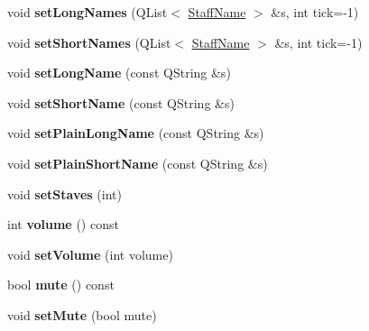 \begin{DoxyCompactItemize}
\item 
\mbox{\label{class_ms_1_1_part_a2ddd2f29d950013f9a850105090d5509}} 
void {\bfseries set\+Long\+Names} (Q\+List$<$ \hyperlink{class_ms_1_1_staff_name}{Staff\+Name} $>$ \&s, int tick=-\/1)
\item 
\mbox{\label{class_ms_1_1_part_a8f1a54bd0b872fefa32e171bd2712060}} 
void {\bfseries set\+Short\+Names} (Q\+List$<$ \hyperlink{class_ms_1_1_staff_name}{Staff\+Name} $>$ \&s, int tick=-\/1)
\item 
\mbox{\label{class_ms_1_1_part_aef3df85794ccf339b54e4e6c683fc40f}} 
void {\bfseries set\+Long\+Name} (const Q\+String \&s)
\item 
\mbox{\label{class_ms_1_1_part_acc3377d2b92a5cb0cb41c4ce61d7063c}} 
void {\bfseries set\+Short\+Name} (const Q\+String \&s)
\item 
\mbox{\label{class_ms_1_1_part_a0da062a1f17c8e4980fb3666608b94c5}} 
void {\bfseries set\+Plain\+Long\+Name} (const Q\+String \&s)
\item 
\mbox{\label{class_ms_1_1_part_a5b52e69bc036527d9fb9fccd6341d80b}} 
void {\bfseries set\+Plain\+Short\+Name} (const Q\+String \&s)
\item 
\mbox{\label{class_ms_1_1_part_a244092dfe0743085b642804e6cc93a21}} 
void {\bfseries set\+Staves} (int)
\item 
\mbox{\label{class_ms_1_1_part_a0e585dd66a3a2346ae3da087f214ce15}} 
int {\bfseries volume} () const
\item 
\mbox{\label{class_ms_1_1_part_a024dbbd42e4feca939eb3bc2f8da57c6}} 
void {\bfseries set\+Volume} (int volume)
\item 
\mbox{\label{class_ms_1_1_part_a0213a26d57ddd89d1e7e7bafc3881dbc}} 
bool {\bfseries mute} () const
\item 
\mbox{\label{class_ms_1_1_part_a6b3c7185f490f8e5ff4f1d49ca9eae76}} 
void {\bfseries set\+Mute} (bool mute)

\end{DoxyCompactItemize}
